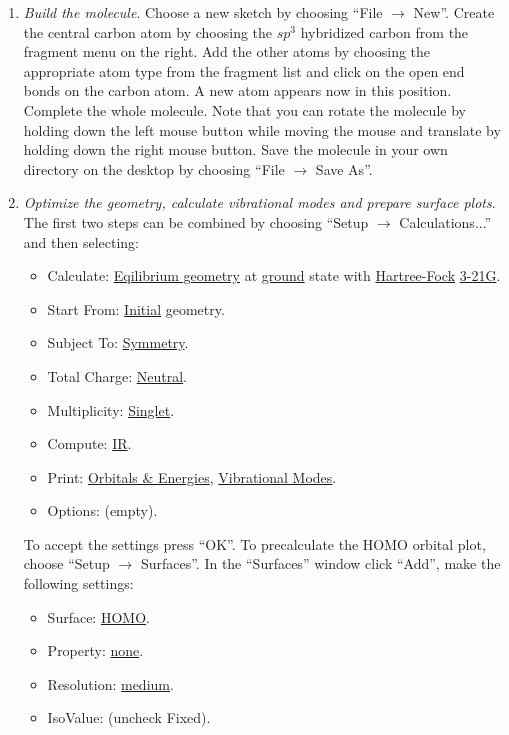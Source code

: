 \documentclass[byrevtex,amssymb,aps,pra,floatfix,letterpaper]{revtex4}
\begin{document}
\begin{enumerate}
\item \textit{Build the molecule}. Choose a new sketch by choosing ``File $\to$ New''. Create the central carbon atom by choosing the $sp^3$ hybridized carbon from the fragment menu on the right. Add the other atoms by choosing the appropriate atom type from the fragment list and click on the open end bonds on the carbon atom. A new atom appears now in this position. Complete the whole molecule. Note that you can rotate the molecule by holding down the left mouse button while moving the mouse and translate by holding down the right mouse button. Save the molecule in your own directory on the desktop by choosing ``File $\to$ Save As''.

\item \textit{Optimize the geometry, calculate vibrational modes and prepare surface plots}. The first two steps can be combined by choosing ``Setup $\to$ Calculations...'' and then selecting:

\begin{itemize}
\item Calculate: \underline{Eqilibrium geometry} at \underline{ground} state with \underline{Hartree-Fock} \underline{3-21G}.
\item Start From: \underline{Initial} geometry.
\item Subject To: \underline{Symmetry}.
\item Total Charge: \underline{Neutral}.
\item Multiplicity: \underline{Singlet}.
\item Compute: \underline{IR}.
\item Print: \underline{Orbitals \& Energies}, \underline{Vibrational Modes}.
\item Options: (empty).
\end{itemize}

To accept the settings press ``OK''. To precalculate the HOMO orbital plot, choose ``Setup $\to$ Surfaces''. In the ``Surfaces'' window click ``Add'', make the following settings:

\begin{itemize}
\item Surface: \underline{HOMO}.
\item Property: \underline{none}.
\item Resolution: \underline{medium}.
\item IsoValue: (uncheck Fixed).
\end{itemize}


\end{enumerate}
\end{document}
